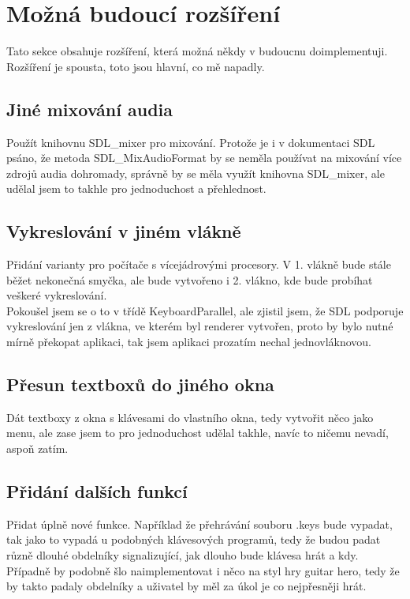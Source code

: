 \documentclass[12pt]{article}
\begin{document}
	
	\newpage
	\maketitle\section{Možná budoucí rozšíření}	
	Tato sekce obsahuje rozšíření, která možná někdy v budoucnu doimplementuji.
	\\
	Rozšíření je spousta, toto jsou hlavní, co mě napadly.
	\subsection{Jiné mixování audia}
	Použít knihovnu SDL\_mixer pro mixování. Protože je i v dokumentaci SDL psáno, že metoda SDL\_MixAudioFormat by se neměla používat na mixování více zdrojů audia dohromady, správně by se měla využít knihovna SDL\_mixer, ale udělal jsem to takhle pro jednoduchost a přehlednost.
	\subsection{Vykreslování v jiném vlákně}
	Přidání varianty pro počítače s vícejádrovými procesory. V 1. vlákně bude stále běžet nekonečná smyčka, ale bude vytvořeno i 2. vlákno, kde bude probíhat veškeré vykreslování.
	\\
	Pokoušel jsem se o to v třídě KeyboardParallel, ale zjistil jsem, že SDL podporuje vykreslování jen z vlákna, ve kterém byl renderer vytvořen, proto by bylo nutné mírně překopat aplikaci, tak jsem aplikaci prozatím nechal jednovláknovou.
	\subsection{Přesun textboxů do jiného okna}
	Dát textboxy z okna s klávesami do vlastního okna, tedy vytvořit něco jako menu, ale zase jsem to pro jednoduchost udělal takhle, navíc to ničemu nevadí, aspoň zatím.
	\subsection{Přidání dalších funkcí}
	Přidat úplně nové funkce. Například že přehrávání souboru .keys bude vypadat, tak jako to vypadá u podobných klávesových programů, tedy že budou padat různě dlouhé obdelníky signalizující, jak dlouho bude klávesa hrát a kdy.
	\\
	Případně by podobně šlo naimplementovat i něco na styl hry guitar hero, tedy že by takto padaly obdelníky a uživatel by měl za úkol je co nejpřesněji hrát.
\end{document}
